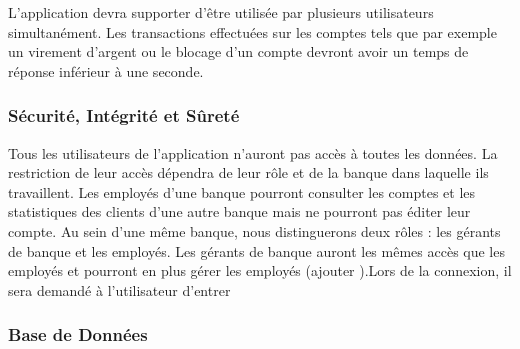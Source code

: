 {\color{orange}{L’application devra être performante sous deux systèmes d’exploitation : Linux et Windows.}}{\color{green}{Par manque de temps, nous avons pas eu le temps de tester notre applications sous Windows.}} L’application devra supporter d’être utilisée par plusieurs utilisateurs simultanément. {\color{orange}{Ces utilisateurs ne pourront pas accéder au même compte en banque en même temps mais pourront effectuer des manipulations sur des comptes différents en même temps.}}{\color{green}{Les utilisateurs peuvent accéder au même compte en même temps et effectuer des opérations}} Les transactions effectuées sur les comptes tels que par exemple un virement d’argent ou le blocage d’un compte devront avoir un temps de réponse inférieur à une seconde.

\subsubsection{Sécurité, Intégrité et Sûreté}

Tous les utilisateurs de l’application n’auront pas accès à toutes les données. La restriction de leur accès dépendra de leur rôle et de la banque dans laquelle ils travaillent. Les employés d’une banque pourront consulter les comptes et les statistiques des clients d’une autre banque mais ne pourront pas éditer leur compte. Au sein d’une même banque, nous distinguerons deux rôles : les gérants de banque et les employés. Les gérants de banque auront les mêmes accès que les employés et pourront en plus gérer les employés (ajouter {\color{red}{ou supprimer des employés, modifier leur salaire}}).Lors de la connexion, il sera demandé à l’utilisateur d’entrer {\color{orange}{son nom, sa banque et son mot de passe.}} {\color{green}{L'utilisateur a uniquement besoin d'entrer son identifiant et son mot de passe.}} {\color{orange}{Grâce à son nom et sa banque, il sera possible de retrouver son rôle afin d’appliquer les restrictions nécessaires.}}{\color{green}{Grâce à son identifiant, il sera possible de retrouver sa banque et son rôle afin d'appliquer les restrictions nécessaires}}

\subsubsection{Base de Données}

